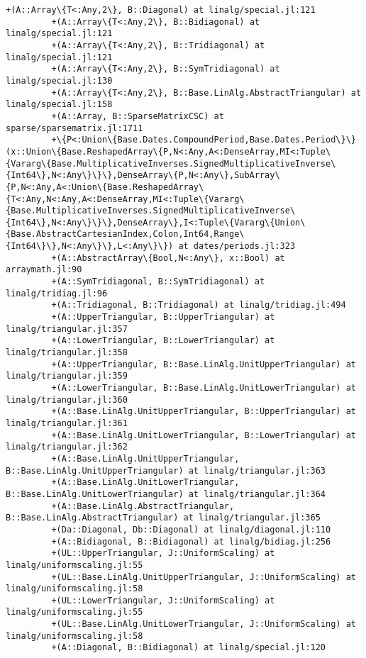 \documentclass[11pt]{article}
\begin{document}
\begin{Verbatim}[commandchars=\\\{\}]
         +(A::Array\{T<:Any,2\}, B::Diagonal) at linalg/special.jl:121
         +(A::Array\{T<:Any,2\}, B::Bidiagonal) at linalg/special.jl:121
         +(A::Array\{T<:Any,2\}, B::Tridiagonal) at linalg/special.jl:121
         +(A::Array\{T<:Any,2\}, B::SymTridiagonal) at linalg/special.jl:130
         +(A::Array\{T<:Any,2\}, B::Base.LinAlg.AbstractTriangular) at linalg/special.jl:158
         +(A::Array, B::SparseMatrixCSC) at sparse/sparsematrix.jl:1711
         +\{P<:Union\{Base.Dates.CompoundPeriod,Base.Dates.Period\}\}(x::Union\{Base.ReshapedArray\{P,N<:Any,A<:DenseArray,MI<:Tuple\{Vararg\{Base.MultiplicativeInverses.SignedMultiplicativeInverse\{Int64\},N<:Any\}\}\},DenseArray\{P,N<:Any\},SubArray\{P,N<:Any,A<:Union\{Base.ReshapedArray\{T<:Any,N<:Any,A<:DenseArray,MI<:Tuple\{Vararg\{Base.MultiplicativeInverses.SignedMultiplicativeInverse\{Int64\},N<:Any\}\}\},DenseArray\},I<:Tuple\{Vararg\{Union\{Base.AbstractCartesianIndex,Colon,Int64,Range\{Int64\}\},N<:Any\}\},L<:Any\}\}) at dates/periods.jl:323
         +(A::AbstractArray\{Bool,N<:Any\}, x::Bool) at arraymath.jl:90
         +(A::SymTridiagonal, B::SymTridiagonal) at linalg/tridiag.jl:96
         +(A::Tridiagonal, B::Tridiagonal) at linalg/tridiag.jl:494
         +(A::UpperTriangular, B::UpperTriangular) at linalg/triangular.jl:357
         +(A::LowerTriangular, B::LowerTriangular) at linalg/triangular.jl:358
         +(A::UpperTriangular, B::Base.LinAlg.UnitUpperTriangular) at linalg/triangular.jl:359
         +(A::LowerTriangular, B::Base.LinAlg.UnitLowerTriangular) at linalg/triangular.jl:360
         +(A::Base.LinAlg.UnitUpperTriangular, B::UpperTriangular) at linalg/triangular.jl:361
         +(A::Base.LinAlg.UnitLowerTriangular, B::LowerTriangular) at linalg/triangular.jl:362
         +(A::Base.LinAlg.UnitUpperTriangular, B::Base.LinAlg.UnitUpperTriangular) at linalg/triangular.jl:363
         +(A::Base.LinAlg.UnitLowerTriangular, B::Base.LinAlg.UnitLowerTriangular) at linalg/triangular.jl:364
         +(A::Base.LinAlg.AbstractTriangular, B::Base.LinAlg.AbstractTriangular) at linalg/triangular.jl:365
         +(Da::Diagonal, Db::Diagonal) at linalg/diagonal.jl:110
         +(A::Bidiagonal, B::Bidiagonal) at linalg/bidiag.jl:256
         +(UL::UpperTriangular, J::UniformScaling) at linalg/uniformscaling.jl:55
         +(UL::Base.LinAlg.UnitUpperTriangular, J::UniformScaling) at linalg/uniformscaling.jl:58
         +(UL::LowerTriangular, J::UniformScaling) at linalg/uniformscaling.jl:55
         +(UL::Base.LinAlg.UnitLowerTriangular, J::UniformScaling) at linalg/uniformscaling.jl:58
         +(A::Diagonal, B::Bidiagonal) at linalg/special.jl:120

\end{Verbatim}
\end{document}
